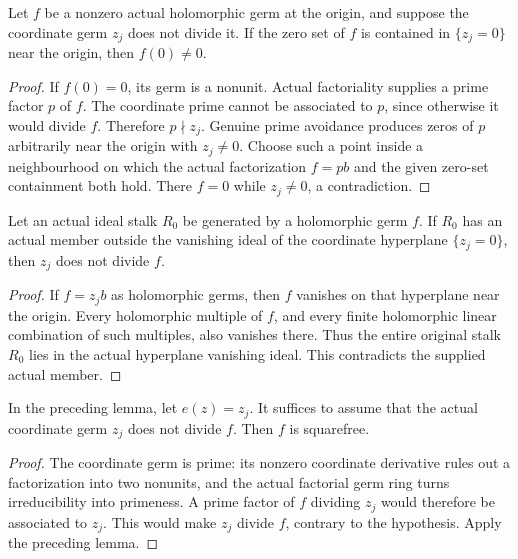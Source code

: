 \begin{lemma}
\label{hir:nonexceptional-equation-not-divisor-supported}
\leanok
Let $f$ be a nonzero actual holomorphic germ at the origin, and suppose
the coordinate germ $z_j$ does not divide it.  If the zero set of $f$
is contained in $\{z_j=0\}$ near the origin, then $f(0)\ne0$.
\end{lemma}
\begin{proof}
If $f(0)=0$, its germ is a nonunit.  Actual factoriality supplies a prime
factor $p$ of $f$.  The coordinate prime cannot be associated to $p$,
since otherwise it would divide $f$.  Therefore $p\nmid z_j$.
Genuine prime avoidance produces zeros of $p$ arbitrarily near the origin
with $z_j\ne0$.  Choose such a point inside a neighbourhood on which
the actual factorization $f=pb$ and the given zero-set containment both
hold.  There $f=0$ while $z_j\ne0$, a contradiction.
\end{proof}

\begin{lemma}
\label{hir:ideal-nonexceptional-witness-coordinate-factor}
\leanok
Let an actual ideal stalk $R_0$ be generated by a holomorphic germ $f$.
If $R_0$ has an actual member outside the vanishing ideal of the coordinate
hyperplane $\{z_j=0\}$, then $z_j$ does not divide $f$.
\end{lemma}
\begin{proof}
If $f=z_j b$ as holomorphic germs, then $f$ vanishes on that hyperplane
near the origin.  Every holomorphic multiple of $f$, and every finite
holomorphic linear combination of such multiples, also vanishes there.
Thus the entire original stalk $R_0$ lies in the actual hyperplane
vanishing ideal.  This contradicts the supplied actual member.
\end{proof}

\begin{corollary}
\label{hir:reduced-germ-across-coordinate-divisor}
\leanok
In the preceding lemma, let $e(z)=z_j$.  It suffices to assume that the
actual coordinate germ $z_j$ does not divide $f$.  Then $f$ is squarefree.
\end{corollary}
\begin{proof}
The coordinate germ is prime: its nonzero coordinate derivative rules out
a factorization into two nonunits, and the actual factorial germ ring
turns irreducibility into primeness.  A prime factor of $f$ dividing
$z_j$ would therefore be associated to $z_j$.  This would make $z_j$
divide $f$, contrary to the hypothesis.  Apply the preceding lemma.
\end{proof}

